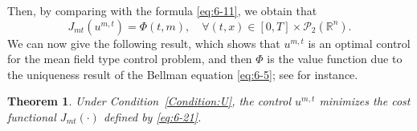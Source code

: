 \documentclass[11pt]{article}
\numberwithin{equation}{section}
\newtheorem{theorem}{Theorem}[section]
\newcommand{\pr}{\mathcal{P}}
\newcommand{\brn}{{\mathbb{R}^n}}
\newcommand{\1}{\mbox{1\hspace{-1mm}I}}
\begin{document}
Then, by comparing with the formula \eqref{eq:6-11}, we obtain that
\begin{equation}\label{eq:6-25}
    J_{mt}\left(u^{m,t}\right)=\Phi(t,m),\quad \forall (t,x)\in[0,T]\times\pr_2(\brn).
\end{equation}
We can now give the following result, which shows that $u^{m,t}$ is an optimal control for the mean field type control problem, and then $\Phi$ is the value function due to the uniqueness result of the Bellman equation \eqref{eq:6-5}; see \cite{AB10} for instance.  

\begin{theorem}\label{theo6-1}
Under Condition~\ref{Condition:U}, the control $u^{m,t}$ minimizes the cost functional $J_{mt}(\cdot)$ defined by \eqref{eq:6-21}. 
\end{theorem}
\end{document}
